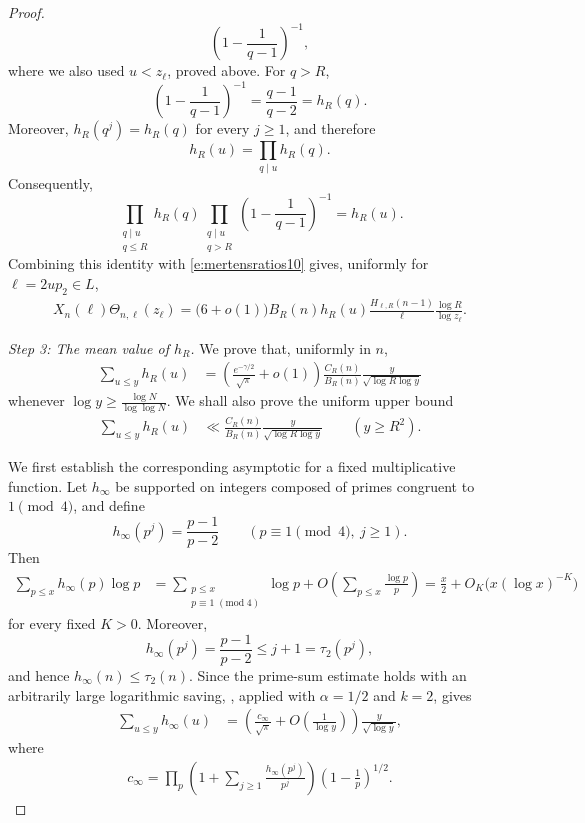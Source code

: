 \documentclass[12pt,reqno]{amsart}
\numberwithin{equation}{section}
\theoremstyle{definition}
\theoremstyle{remark}
\begin{document}
\begin{proof}
\[ \left(1-\frac1{q-1}\right)^{-1},
\]
where we also used \(u<z_\ell\), proved above.  For \(q>R\),
\[
 \left(1-\frac1{q-1}\right)^{-1}
 =\frac{q-1}{q-2}
 =h_R(q).
\]
Moreover, \(h_R(q^j)=h_R(q)\) for every \(j\geq1\), and therefore
\[
 h_R(u)=\prod_{q\mid u}h_R(q).
\]
Consequently,
\[
 \prod_{\substack{q\mid u\\q\leq R}}h_R(q)
 \prod_{\substack{q\mid u\\q>R}}
 \left(1-\frac1{q-1}\right)^{-1}
 =h_R(u).
\]
Combining this identity with \eqref{e:mertensratios10} gives, uniformly
for \(\ell=2up_2\in L\),
\begin{align}\label{e:uppernormalization10}
 X_n(\ell)\Theta_{n,\ell}(z_\ell)
 =
 \bigl(6+o(1)\bigr)
 B_R(n)h_R(u)\frac{H_{\ell,R}(n-1)}{\ell}
 \frac{\log R}{\log z_\ell}.
\end{align}

\emph{Step 3: The mean value of \(h_R\).}
We prove that, uniformly in \(n\),
\begin{align}\label{e:meanvaluehR10}
 \sum_{u\leq y}h_R(u)
 &=
 \left(\frac{e^{-\gamma/2}}{\sqrt\pi}+o(1)\right)
 \frac{C_R(n)}{B_R(n)}
 \frac{y}{\sqrt{\log R\log y}}
\end{align}
whenever $\log y\geq\frac{\log N}{\log\log N}.$
We shall also prove the uniform upper bound
\begin{align}\label{e:meanvaluehRupper10}
 \sum_{u\leq y}h_R(u)
 &\ll
 \frac{C_R(n)}{B_R(n)}
 \frac{y}{\sqrt{\log R\log y}}
 \qquad (y\geq R^2).
\end{align}

We first establish the corresponding asymptotic for a fixed
multiplicative function.  Let \(h_\infty\) be supported on integers
composed of primes congruent to \(1\pmod4\), and define
\[
 h_\infty(p^j)=\frac{p-1}{p-2}
 \qquad
 (p\equiv1\pmod4,\ j\geq1).
\]
Then
\begin{align*}
 \sum_{p\leq x}h_\infty(p)\log p
 &=
 \sum_{\substack{p\leq x\\p\equiv1\;(\mathrm{mod}\;4)}}
 \log p
 +O\left(\sum_{p\leq x}\frac{\log p}{p}\right)=
 \frac{x}{2}+O_K\bigl(x(\log x)^{-K}\bigr)
\end{align*}
for every fixed \(K>0\).  Moreover,
\[
 h_\infty(p^j)=\frac{p-1}{p-2}\leq j+1=\tau_2(p^j),
\]
and hence \(h_\infty(n)\leq\tau_2(n)\).  Since the prime-sum
estimate holds with an arbitrarily large logarithmic saving,
\cite[Theorem~1]{GranvilleKoukoulopoulos}, applied with
\(\alpha=1/2\) and \(k=2\), gives
\begin{align}\label{e:meanvaluehinfty10}
 \sum_{u\leq y}h_\infty(u)
 &=
 \left(\frac{c_\infty}{\sqrt\pi}
 +O\left(\frac1{\log y}\right)\right)
 \frac{y}{\sqrt{\log y}},
\end{align}
where
\begin{align}\label{e:defcinfty10}
 c_\infty
 =
 \prod_p
 \left(1+\sum_{j\geq1}\frac{h_\infty(p^j)}{p^j}\right)
 \left(1-\frac1p\right)^{1/2}.
\end{align}


\end{proof}
\end{document}
